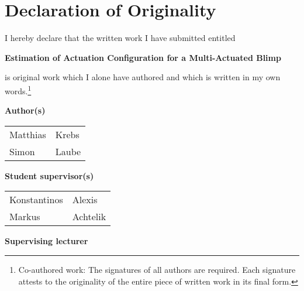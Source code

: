 
\section*{Declaration of Originality}

\vspace{1cm}

I hereby declare that the written work I have submitted entitled

\vspace{0.5cm}

\textbf{Estimation of Actuation Configuration for a Multi-Actuated Blimp}

\vspace{0.5cm}

is original work which I alone have authored and which is written in my own words.\footnote{Co-authored work: The signatures of all authors are required. Each signature attests to the originality of the entire piece of written work in its final form.}

\vspace{1cm}

\textbf{Author(s)}

\vspace{0.5cm}

\begin{tabular}{ p{5cm} p{5cm} }
  Matthias & Krebs \\
  Simon & Laube \\
\end{tabular}

\vspace{0.5cm}

\textbf{Student supervisor(s)}

\vspace{0.5cm}

\begin{tabular}{ p{5cm} p{5cm} }
  Konstantinos & Alexis \\
  Markus & Achtelik \\
\end{tabular}

\vspace{1cm}


\textbf{Supervising lecturer}

\vspace{0.5cm}

